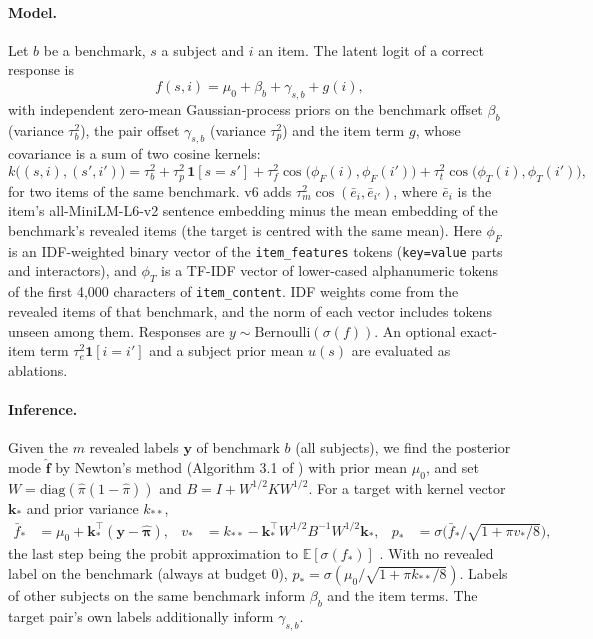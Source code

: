 \documentclass{article}
\begin{document}
\paragraph{Model.} Let $b$ be a benchmark, $s$ a subject and $i$ an item. The latent logit of a
correct response is
\begin{equation}
f(s,i) = \mu_0 + \beta_b + \gamma_{s,b} + g(i),
\end{equation}
with independent zero-mean Gaussian-process priors on the benchmark offset $\beta_b$ (variance
$\tau_b^2$), the pair offset $\gamma_{s,b}$ (variance $\tau_p^2$) and the item term $g$, whose
covariance is a sum of two cosine kernels:
\begin{equation}
k\big((s,i),(s',i')\big) = \tau_b^2 + \tau_p^2\,\mathbf{1}[s=s'] + \tau_f^2\cos\!\big(\phi_F(i),\phi_F(i')\big) + \tau_t^2 \cos\!\big(\phi_T(i),\phi_T(i')\big),
\end{equation}
for two items of the same benchmark. v6 adds $\tau_m^2\cos(\bar e_i,\bar e_{i'})$, where $\bar e_i$
is the item's all-MiniLM-L6-v2 sentence embedding minus the mean embedding of the benchmark's
revealed items (the target is centred with the same mean). Here $\phi_F$ is an IDF-weighted binary vector of the
\texttt{item\_features} tokens (\texttt{key=value} parts and interactors), and $\phi_T$ is a TF-IDF
vector of lower-cased alphanumeric tokens of the first 4,000 characters of \texttt{item\_content}.
IDF weights come from the revealed items of that benchmark, and the norm of each vector
includes tokens unseen among them. Responses are $y \sim \mathrm{Bernoulli}(\sigma(f))$. An optional
exact-item term $\tau_e^2\mathbf{1}[i=i']$ and a subject prior mean $u(s)$ are evaluated as
ablations.

\paragraph{Inference.} Given the $m$ revealed labels $\mathbf{y}$ of benchmark $b$ (all subjects),
we find the posterior mode $\hat{\mathbf{f}}$ by Newton's method (Algorithm 3.1 of
\citet{rasmussen2006}) with prior mean $\mu_0$, and set $W=\mathrm{diag}(\hat\pi(1-\hat\pi))$ and
$B = I + W^{1/2} K W^{1/2}$. For a target with kernel vector $\mathbf{k}_*$ and prior variance $k_{**}$,
\begin{align}
\bar f_* &= \mu_0 + \mathbf{k}_*^\top(\mathbf{y}-\hat{\boldsymbol\pi}), &
v_* &= k_{**} - \mathbf{k}_*^\top W^{1/2}B^{-1}W^{1/2}\mathbf{k}_*, &
p_* &= \sigma\!\Big(\bar f_* \big/ \sqrt{1+\pi v_*/8}\Big),
\end{align}
the last step being the probit approximation to $\mathbb{E}[\sigma(f_*)]$ \citep{mackay1992}.
With no revealed label on the benchmark (always at budget 0), $p_* = \sigma(\mu_0/\sqrt{1+\pi k_{**}/8})$.
Labels of other subjects on the same benchmark inform $\beta_b$ and the item terms. The target
pair's own labels additionally inform $\gamma_{s,b}$.
\end{document}
